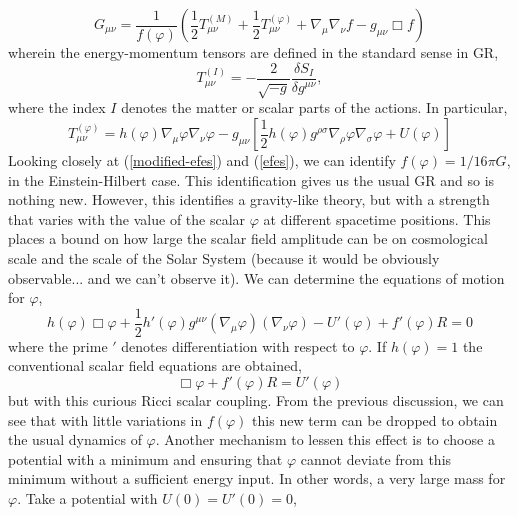 \begin{equation}\label{modified-efes}
    G_{\mu\nu} = \frac{1}{f(\varphi)}\left(\frac{1}{2}T_{\mu\nu}^{(M)} + \frac{1}{2}T_{\mu\nu}^{(\varphi)} + \nabla_{\mu}\nabla_{\nu}f - g_{\mu\nu}\Box f\right)
\end{equation}
wherein the energy-momentum tensors are defined in the standard sense in GR,
\begin{equation}
T^{(I)}_{\mu\nu} = -\frac{2}{\sqrt{-g}}\frac{\delta S_{I}}{\delta g^{\mu\nu}},
\end{equation}
where the index $I$ denotes the matter or scalar parts of the actions. In particular, 
\begin{equation}
    T_{\mu\nu}^{(\varphi)} = h(\varphi)\nabla_{\mu}\varphi\nabla_{\nu}\varphi - g_{\mu\nu}\left[\frac{1}{2}h(\varphi)g^{\rho\sigma}\nabla_{\rho}\varphi\nabla_{\sigma}\varphi + U(\varphi)\right]
\end{equation}
Looking closely at (\ref{modified-efes}) and (\ref{efes}), we can identify $f(\varphi) = 1/16\pi G$, in the Einstein-Hilbert case. This identification gives us the usual GR and so is nothing new. However, this identifies a gravity-like theory, but with a strength that varies with the value of the scalar $\varphi$ at different spacetime positions. This places a bound on how large the scalar field amplitude can be on cosmological scale and the scale of the Solar System (because it would be obviously observable... and we can't observe it). We can determine the equations of motion for $\varphi$, 
\begin{equation}
    h(\varphi)\Box\varphi + \frac{1}{2}h'(\varphi)g^{\mu\nu}(\nabla_{\mu}\varphi)(\nabla_{\nu}\varphi) - U'(\varphi) + f'(\varphi)R = 0
\end{equation}
where the prime $'$ denotes differentiation with respect to $\varphi$. If $h(\varphi) = 1$ the conventional scalar field equations are obtained, 
\begin{equation}
    \Box\varphi + f'(\varphi)R= U'(\varphi)
\end{equation}
but with this curious Ricci scalar coupling. From the previous discussion, we can see that with little variations in $f(\varphi)$ this new term can be dropped to obtain the usual dynamics of $\varphi$. Another mechanism to lessen this effect is to choose a potential with a minimum and ensuring that $\varphi$ cannot deviate from this minimum without a sufficient energy input. In other words, a very large mass for $\varphi$. Take a potential with $U(0) = U'(0) = 0$, 

